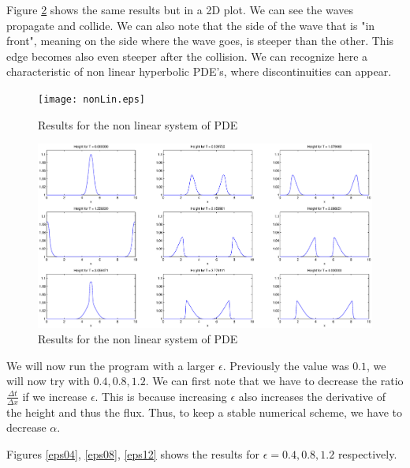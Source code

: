 Figure \ref{nonL} shows the same results but in a 2D plot. We can see the waves propagate and collide. We can also note that the side of the wave that is "in front", meaning on the side where the wave goes, is steeper than the other. This edge becomes also even steeper after the collision. We can recognize here a characteristic of non linear hyperbolic PDE's, where discontinuities can appear.

\begin{figure}
\begin{center}
\texttt{[image: nonLin.eps]}
\caption{Results for the non linear system of PDE}
\label{nonLin}
\end{center}
\end{figure}

\begin{figure}
\begin{center}
\includegraphics[scale=0.4]{nonL.eps}
\caption{Results for the non linear system of PDE}
\label{nonL}
\end{center}
\end{figure}


We will now run the program with a larger $\epsilon$. Previously the value was $0.1$, we will now try with $0.4,0.8,1.2$. We can first note that we have to decrease the ratio $\frac{\Delta t}{\Delta x}$ if we increase $\epsilon$. This is because increasing $\epsilon$ also increases the derivative of the height and thus the flux. Thus, to keep a stable numerical scheme, we have to decrease $\alpha$.

Figures \ref{eps04}, \ref{eps08}, \ref{eps12} shows the results for $\epsilon = 0.4,0.8,1.2$ respectively.

